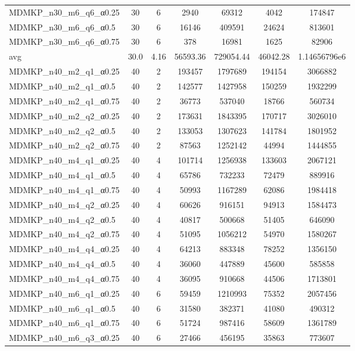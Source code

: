 \begin{table}[!ht]
\begin{tabular}{lcccccc}
MDMKP\_n30\_m6\_q6\_α0.25 & 30 & 6 & 2940 & 69312 & 4042 & 174847 \\
MDMKP\_n30\_m6\_q6\_α0.5 & 30 & 6 & 16146 & 409591 & 24624 & 813601 \\
MDMKP\_n30\_m6\_q6\_α0.75 & 30 & 6 & 378 & 16981 & 1625 & 82906 \\
\cline{1-9} avg & 30.0 & 4.16 & 56593.36& 729054.44 & 46042.28& 1.14656796e6\\ \hline
MDMKP\_n40\_m2\_q1\_α0.25 & 40 & 2 & 193457 & 1797689 & 194154 & 3066882 \\
MDMKP\_n40\_m2\_q1\_α0.5 & 40 & 2 & 142577 & 1427958 & 150259 & 1932299 \\
MDMKP\_n40\_m2\_q1\_α0.75 & 40 & 2 & 36773 & 537040 & 18766 & 560734 \\
MDMKP\_n40\_m2\_q2\_α0.25 & 40 & 2 & 173631 & 1843395 & 170717 & 3026010 \\
MDMKP\_n40\_m2\_q2\_α0.5 & 40 & 2 & 133053 & 1307623 & 141784 & 1801952 \\
MDMKP\_n40\_m2\_q2\_α0.75 & 40 & 2 & 87563 & 1252142 & 44994 & 1444855 \\
MDMKP\_n40\_m4\_q1\_α0.25 & 40 & 4 & 101714 & 1256938 & 133603 & 2067121 \\
MDMKP\_n40\_m4\_q1\_α0.5 & 40 & 4 & 65786 & 732233 & 72479 & 889916 \\
MDMKP\_n40\_m4\_q1\_α0.75 & 40 & 4 & 50993 & 1167289 & 62086 & 1984418 \\
MDMKP\_n40\_m4\_q2\_α0.25 & 40 & 4 & 60626 & 916151 & 94913 & 1584473 \\
MDMKP\_n40\_m4\_q2\_α0.5 & 40 & 4 & 40817 & 500668 & 51405 & 646090 \\
MDMKP\_n40\_m4\_q2\_α0.75 & 40 & 4 & 51095 & 1056212 & 54970 & 1580267 \\
MDMKP\_n40\_m4\_q4\_α0.25 & 40 & 4 & 64213 & 883348 & 78252 & 1356150 \\
MDMKP\_n40\_m4\_q4\_α0.5 & 40 & 4 & 36060 & 447889 & 45600 & 585858 \\
MDMKP\_n40\_m4\_q4\_α0.75 & 40 & 4 & 36095 & 910668 & 44506 & 1713801 \\
MDMKP\_n40\_m6\_q1\_α0.25 & 40 & 6 & 59459 & 1210993 & 75352 & 2057456 \\
MDMKP\_n40\_m6\_q1\_α0.5 & 40 & 6 & 31580 & 382371 & 41080 & 490312 \\
MDMKP\_n40\_m6\_q1\_α0.75 & 40 & 6 & 51724 & 987416 & 58609 & 1361789 \\
MDMKP\_n40\_m6\_q3\_α0.25 & 40 & 6 & 27466 & 456195 & 35863 & 773607 \\

\end{tabular}
\end{table}
